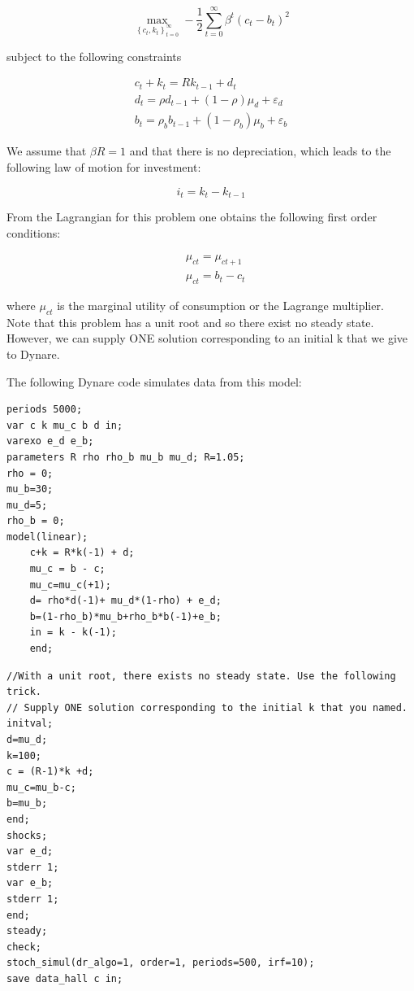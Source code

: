 \documentclass[10pt]{article}
\begin{document}
$$
\max _{\left\{c_{t}, k_{t}\right\}_{t=0}^{\infty}}-\frac{1}{2} \sum_{t=0}^{\infty} \beta^{t}\left(c_{t}-b_{t}\right)^{2}
$$

subject to the following constraints

$$
\begin{gathered}
c_{t}+k_{t}=R k_{t-1}+d_{t} \\
d_{t}=\rho d_{t-1}+(1-\rho) \mu_{d}+\varepsilon_{d} \\
b_{t}=\rho_{b} b_{t-1}+\left(1-\rho_{b}\right) \mu_{b}+\varepsilon_{b}
\end{gathered}
$$

We assume that $\beta R=1$ and that there is no depreciation, which leads to the following law of motion for investment:

$$
i_{t}=k_{t}-k_{t-1}
$$

From the Lagrangian for this problem one obtains the following first order conditions:

$$
\begin{aligned}
& \mu_{c t}=\mu_{c t+1} \\
& \mu_{c t}=b_{t}-c_{t}
\end{aligned}
$$

where $\mu_{c t}$ is the marginal utility of consumption or the Lagrange multiplier.\\
Note that this problem has a unit root and so there exist no steady state. However, we can supply ONE solution corresponding to an initial k that we give to Dynare.

The following Dynare code simulates data from this model:

\begin{verbatim}
periods 5000;
var c k mu_c b d in;
varexo e_d e_b;
parameters R rho rho_b mu_b mu_d; R=1.05;
rho = 0;
mu_b=30;
mu_d=5;
rho_b = 0;
model(linear);
    c+k = R*k(-1) + d;
    mu_c = b - c;
    mu_c=mu_c(+1);
    d= rho*d(-1)+ mu_d*(1-rho) + e_d;
    b=(1-rho_b)*mu_b+rho_b*b(-1)+e_b;
    in = k - k(-1);
    end;
\end{verbatim}

\begin{verbatim}
//With a unit root, there exists no steady state. Use the following trick.
// Supply ONE solution corresponding to the initial k that you named.
initval;
d=mu_d;
k=100;
c = (R-1)*k +d;
mu_c=mu_b-c;
b=mu_b;
end;
shocks;
var e_d;
stderr 1;
var e_b;
stderr 1;
end;
steady;
check;
stoch_simul(dr_algo=1, order=1, periods=500, irf=10);
save data_hall c in;
\end{verbatim}
\end{document}
